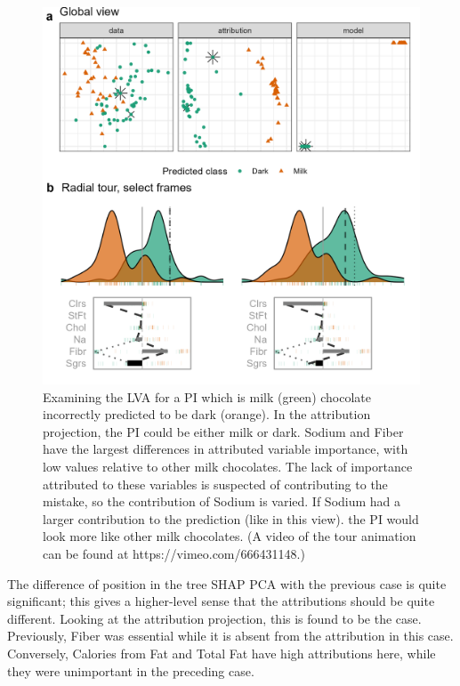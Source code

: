 \documentclass[
]{sn-jnl}
\begin{document}
\begin{CodeChunk}
\begin{figure}

{\centering \includegraphics[width=1\linewidth]{./figures/case_chocolates_inverse} 

}

\caption[Examining the LVA for a PI which is milk (green) chocolate incorrectly predicted to be dark (orange)]{Examining the LVA for a PI which is milk (green) chocolate incorrectly predicted to be dark (orange). In the attribution projection, the PI could be either milk or dark. Sodium and Fiber have the largest differences in attributed variable importance, with low values relative to other milk chocolates. The lack of importance attributed to these variables is suspected of contributing to the mistake, so the contribution of Sodium is varied. If Sodium had a larger contribution to the prediction (like in this view). the PI would look more like other milk chocolates. (A video of the tour animation can be found at https://vimeo.com/666431148.)}\label{fig:casechocolatesinverse}
\end{figure}
\end{CodeChunk}

The difference of position in the tree SHAP PCA with the previous case
is quite significant; this gives a higher-level sense that the
attributions should be quite different. Looking at the attribution
projection, this is found to be the case. Previously, Fiber was
essential while it is absent from the attribution in this case.
Conversely, Calories from Fat and Total Fat have high attributions here,
while they were unimportant in the preceding case.
\end{document}
